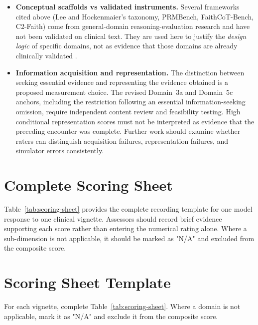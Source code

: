 \documentclass{article}
\begin{document}
\begin{itemize}
\item \textbf{Conceptual scaffolds vs validated instruments.} Several frameworks cited above (Lee and Hockenmaier's taxonomy, PRMBench, FaithCoT-Bench, C2-Faith) come from general-domain reasoning-evaluation research and have not been validated on clinical text. They are used here to justify the \emph{design logic} of specific domains, not as evidence that those domains are already clinically validated \cite{lee2025survey,song2025prmbench,shen2025faithcotbench,mittal2026c2faith}.

\item \textbf{Information acquisition and representation.}
The distinction between seeking essential evidence and representing the evidence obtained is a proposed measurement choice. The revised Domain~3a and Domain~5c anchors, including the restriction following an essential information-seeking omission, require independent content review and feasibility testing. High conditional representation scores must not be interpreted as evidence that the preceding encounter was complete. Further work should examine whether raters can distinguish acquisition failures, representation failures, and simulator errors consistently.


\end{itemize}





\appendix
\section{Complete Scoring Sheet}
\label{app:scoring-sheet}

Table~\ref{tab:scoring-sheet} provides the complete recording template
for one model response to one clinical vignette. Assessors should record
brief evidence supporting each score rather than entering the numerical
rating alone. Where a sub-dimension is not applicable, it should be
marked as "N/A" and excluded from the composite score.

\section{Scoring Sheet Template}

For each vignette, complete Table~\ref{tab:scoring-sheet}.
Where a domain is not applicable, mark it as "N/A" and exclude it
from the composite score.
\end{document}
